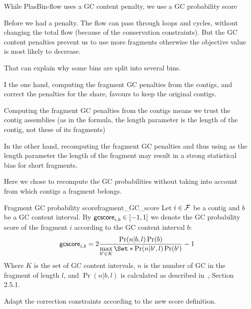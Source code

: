 \begin{newfeatbox}
  While PlasBin-flow uses a GC content penalty, we use a GC probability score

  \begin{questionbox}
    Before we had a penalty.
    The flow can pass through loops and cycles, without changing the total flow (because of the conservation constraints). But the GC content penalties prevent us to use more fragments otherwise the objective value is most likely to decrease.

    That can explain why some bins are split into several bins.
  \end{questionbox}

  \begin{questionbox}
    I the one hand, computing the fragment GC penalties from the contigs, and correct the penalties for the share, favours to keep the original contigs.

    Computing the fragment GC penalties from the contigs means we trust the contig assemblies (as in the formula, the length parameter is the length of the contig, not these of its fragments)

    In the other hand, recomputing the fragment GC penalties and thus using as the length parameter the length of the fragment may result in a strong statistical bias for short fragments.

    \begin{notebox}
      Here we chose to recompute the GC probabilities without taking into account from which contigs a fragment belongs.
    \end{notebox}
  \end{questionbox}
\end{newfeatbox}

\begin{definition}{Fragment GC probability score}{fragment_GC_score}
  Let \(i \in \mathcal{F}{}\) be a contig and \(b\) be a GC content interval.
  By \(\mathsf{gcscore}_{i, b} \in [-1, 1]\) we denote the GC probability score of the fragment \(i\) according to the GC content interval \(b\):
  \[
    \gcscore{i}{b} = 2 \frac{\Pr(n|b,l)\Pr(b)}{\max\limits_{b' \in K}\Set*{\Pr(n|b',l)\Pr(b')}} - 1
  \]
  Where \(K\) is the set of GC content intervals, \(n\) is the number of GC in the fragment of length \(l\), and \(\Pr(n|b,l)\) is calculated as described in~\cite{manePlasBinflowFlowbasedMILP2023}, Section 2.5.1.

  \begin{fixmebox}
    Adapt the correction constraints according to the new score definition.
  \end{fixmebox}
\end{definition}

